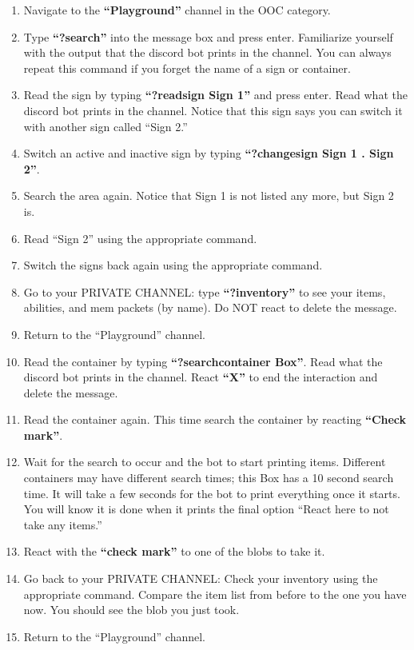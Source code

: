 \documentclass[green]{TMFHope}
\begin{document}
\begin{enumerate}
  \item Navigate to the \textbf{``Playground''} channel in the OOC category.
  \item Type \textbf{``?search''} into the message box and press enter. Familiarize yourself with the output that the discord  bot prints in the channel. You can always repeat this command if you forget the name of a sign or container.
	\item Read the sign by typing \textbf{``?readsign Sign 1''} and press enter. Read what the discord bot prints in the channel. Notice that this sign says you can switch it with another sign called ``Sign 2.''
	\item Switch an active and inactive sign by typing \textbf{``?changesign Sign 1 . Sign 2''}. 
	\item Search the area again. Notice that Sign 1 is not listed any more, but Sign 2 is.
	\item Read ``Sign 2'' using the appropriate command.
	\item Switch the signs back again using the appropriate command.
	\item Go to your PRIVATE CHANNEL: type \textbf{``?inventory''} to see your items, abilities, and mem packets (by name). Do NOT react to delete the message.
	\item Return to the ``Playground'' channel.
	\item Read the container by typing \textbf{``?searchcontainer Box''}. Read what the discord bot prints in the channel. React \textbf{``X''} to end the interaction and delete the message.
	\item Read the container again. This time search the container by reacting \textbf{``Check mark''}.
	\item Wait for the search to occur and the bot to start printing items. Different containers may have different search times; this Box has a 10 second search time. It will take a few seconds for the bot to print everything once it starts. You will know it is done when it prints the final option ``React here to not take any items.''
	\item React with the \textbf{``check mark''} to one of the blobs to take it.
	\item Go back to your PRIVATE CHANNEL: Check your inventory using the appropriate command. Compare the item list from before to the one you have now. You should see the blob you just took. 
	\item Return to the ``Playground'' channel.

\end{enumerate}
\end{document}
